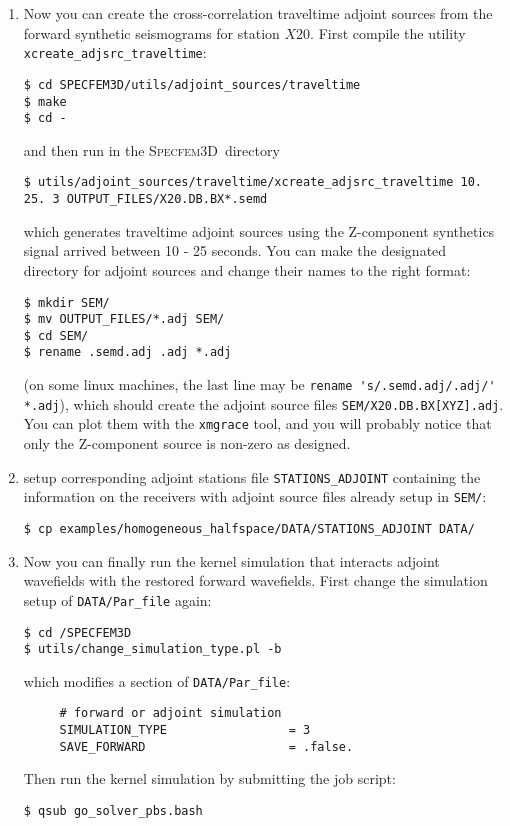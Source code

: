 \documentclass[10pt,fleqn,letterpaper]{article}
\newcommand{\specfem}{\textsc{Specfem3D}}
\begin{document}
\begin{enumerate}
\item Now you can create the cross-correlation traveltime adjoint sources from the forward synthetic seismograms for station $X20$. First compile the utility \verb+xcreate_adjsrc_traveltime+:
\begin{lstlisting}
$ cd SPECFEM3D/utils/adjoint_sources/traveltime
$ make
$ cd -
\end{lstlisting}
and then run in the \specfem\ directory
\begin{lstlisting}
$ utils/adjoint_sources/traveltime/xcreate_adjsrc_traveltime 10. 25. 3 OUTPUT_FILES/X20.DB.BX*.semd
\end{lstlisting}
which generates traveltime adjoint sources  using the Z-component synthetics signal arrived between 10 - 25 seconds. You can make the designated directory for adjoint sources and change their names to the right format:
\begin{lstlisting}
$ mkdir SEM/
$ mv OUTPUT_FILES/*.adj SEM/
$ cd SEM/
$ rename .semd.adj .adj *.adj
\end{lstlisting}
(on some linux machines, the last line may be \verb+rename 's/.semd.adj/.adj/' *.adj+), which  should create the adjoint source files \verb+SEM/X20.DB.BX[XYZ].adj+. You can plot them with the \verb+xmgrace+ tool, and you will probably notice that only the Z-component source is non-zero as designed.

\item setup corresponding adjoint stations file \verb+STATIONS_ADJOINT+ containing the information on the receivers with adjoint source files already setup in \verb+SEM/+:
\begin{lstlisting}
$ cp examples/homogeneous_halfspace/DATA/STATIONS_ADJOINT DATA/
\end{lstlisting}

\item Now you can finally run the kernel simulation that interacts adjoint wavefields with the restored forward wavefields. First change the simulation setup of \verb+DATA/Par_file+ again:
\begin{lstlisting}
$ cd /SPECFEM3D
$ utils/change_simulation_type.pl -b
\end{lstlisting}
which modifies a section of \verb+DATA/Par_file+:
\begin{lstlisting}
     # forward or adjoint simulation
     SIMULATION_TYPE                 = 3
     SAVE_FORWARD                    = .false.
\end{lstlisting}
Then run the kernel simulation by submitting the job script:
\begin{lstlisting}
$ qsub go_solver_pbs.bash
\end{lstlisting}


\end{enumerate}
\end{document}
